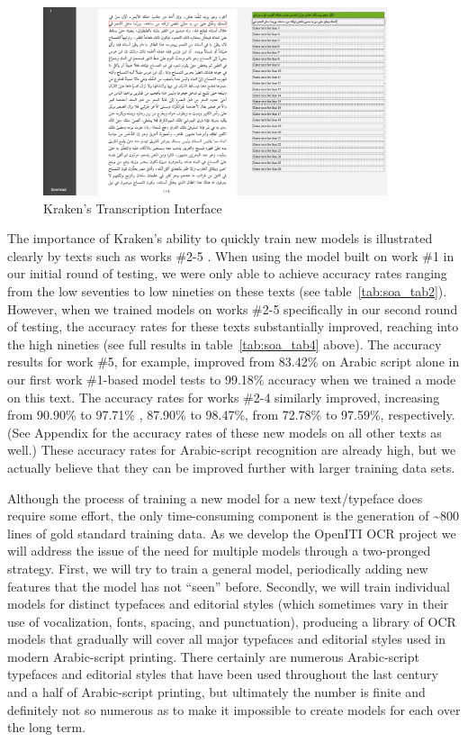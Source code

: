 \begin{figure}
        \centering
        \includegraphics[width=0.9\textwidth]{images/image10.png}
	\caption{Kraken’s Transcription Interface}
	\label{fig:soa_1}
\end{figure}


The importance of Kraken’s ability to quickly train new models is illustrated
clearly by texts such as works \#2-5 . When using the model built on work \#1 in
our initial round of testing, we were only able to achieve accuracy rates
ranging from the low seventies to low nineties on these texts (see table~\ref{tab:soa_tab2}).
However, when we trained models on works \#2-5 specifically in our second round
of testing, the accuracy rates for these texts substantially improved, reaching
into the high nineties (see full results in table~\ref{tab:soa_tab4} above). The accuracy
results for work \#5, for example, improved from 83.42\% on Arabic script alone
in our first work \#1-based model tests to 99.18\% accuracy when we trained a
mode on this text. The accuracy rates for works \#2-4 similarly improved,
increasing from 90.90\% to 97.71\% , 87.90\% to 98.47\%, from 72.78\% to
97.59\%, respectively. (See Appendix for the accuracy rates of these new models
on all other texts as well.) These accuracy rates for Arabic-script recognition
are already high, but we actually believe that they can be improved further
with larger training data sets.

Although the process of training a new model for a new text/typeface does
require some effort, the only time-consuming component is the generation of
\textasciitilde800 lines of gold standard training data. As we develop the OpenITI OCR
project we will address the issue of the need for multiple models through a
two-pronged strategy. First, we will try to train a general model, periodically
adding new features that the model has not “seen” before. Secondly, we will
train individual models for distinct typefaces and editorial styles (which
sometimes vary in their use of vocalization, fonts, spacing, and punctuation),
producing a library of OCR models that gradually will cover all major typefaces
and editorial styles used in modern Arabic-script printing. There certainly are
numerous Arabic-script typefaces and editorial styles that have been used
throughout the last century and a half of Arabic-script printing, but
ultimately the number is finite and definitely not so numerous as to make it
impossible to create models for each over the long term.  


